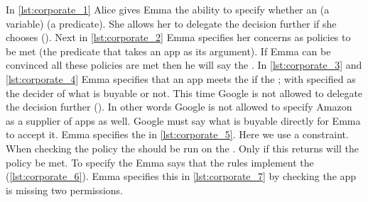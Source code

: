 \documentclass[]{scrartcl}
\begin{document}
In \autoref{lst:corporate_1} Alice gives Emma the ability to specify whether an  (a variable)  (a predicate).
She allows her to delegate the decision further if she chooses ().
Next in \autoref{lst:corporate_2} Emma specifies her concerns as policies to be met (the  predicate that takes an app as its argument).
If Emma can be convinced all these policies are met then he will say the .
In \autoref{lst:corporate_3} and \autoref{lst:corporate_4} Emma specifies that an app meets the  if the ;
  with  specified as the decider of what is buyable or not.
This time Google is not allowed to delegate the decision further ().
In other words Google is not allowed to specify Amazon as a supplier of apps as well.
Google must say what is buyable directly for Emma to accept it.
Emma specifies the  in \autoref{lst:corporate_5}.
Here we use a constraint.
When checking the policy the  should be run on the .
Only if this returns  will the policy be met.
To specify the  Emma says that the  rules implement the  (\autoref{lst:corporate_6}).
Emma specifies this in \autoref{lst:corporate_7} by checking the app is missing two permissions.
\end{document}
